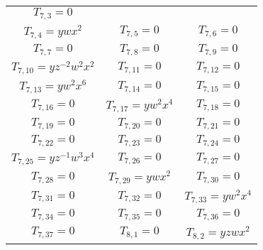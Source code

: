 \begin{longtable}{|c|c|c|}
$T_{7,3}= 0$\\

$T_{7,4}= ywx^2$&

$T_{7,5}= 0$&

$T_{7,6}= 0$\\

$T_{7,7}= 0$&

$T_{7,8}= 0$&

$T_{7,9}= 0$\\

$T_{7,10}= yz^{-2}w^2x^2$&

$T_{7,11}= 0$&

$T_{7,12}= 0$\\

$T_{7,13}= yw^2x^6$&

$T_{7,14}= 0$&

$T_{7,15}= 0$\\

$T_{7,16}= 0$&

$T_{7,17}= yw^2x^4$&

$T_{7,18}= 0$\\

$T_{7,19}= 0$&

$T_{7,20}= 0$&

$T_{7,21}= 0$\\

$T_{7,22}= 0$&

$T_{7,23}= 0$&

$T_{7,24}= 0$\\

$T_{7,25}= yz^{-1}w^3x^4$&

$T_{7,26}= 0$&

$T_{7,27}= 0$\\

$T_{7,28}= 0$&

$T_{7,29}= ywx^2$&

$T_{7,30}= 0$\\

$T_{7,31}= 0$&

$T_{7,32}= 0$&

$T_{7,33}= yw^2x^4$\\

$T_{7,34}= 0$&

$T_{7,35}= 0$&

$T_{7,36}= 0$\\

$T_{7,37}= 0$&

$T_{8,1}= 0$&

$T_{8,2}= yzwx^2$\\


\end{longtable}
